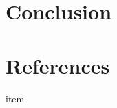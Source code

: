 \documentclass[11pt, oneside]{article}
\begin{document}
\section{Conclusion}


\section{References}

\noindent

\begin{description}

\item item

\end{description}
\end{document}
